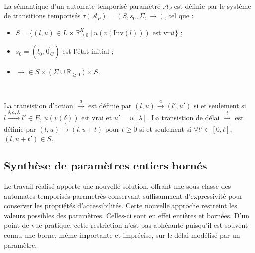 \documentclass{article}
\begin{document}
        ~

        La sémantique d'un automate temporisé paramètré $\mathcal{A}_P$ est
        définie par le système de transitions temporisés $\tau(\mathcal{A}_P) =
        (S,s_0,\Sigma,\rightarrow)$, tel que :
        
        \begin{itemize}
          \item $S = \{(l,u) \in L \times \mathbb{R}_{\geq 0}^X ~|~
            u(v(\mathrm{Inv}(l)))$ est vrai$\}$ ;
          \item $s_0 = (l_0, \vec{0}_C)$ est l'état initial ;
          \item $\rightarrow \in S \times (\Sigma \cup \mathbb{R}_{\geq 0})
            \times S$.
        \end{itemize}
        
        ~
        
        La transistion d'action $\xrightarrow{a}$ est définie par $(l,u)
        \xrightarrow{a} (l',u')$ si et seulement si $l \xrightarrow{\delta,a,
          \lambda} l' \in E$, $u(v(\delta))$ est vrai et $u' = u[\lambda]$. La
        transistion de délai $\xrightarrow{t}$ est définie par $(l,u)
        \xrightarrow{t} (l,u+t)$ pour $t \geq 0$ si et seulement si $\forall t'
        \in [0,t]$, $(l,u+t') \in S$.

    \subsection{Synthèse de paramètres entiers bornés}

      
      Le travail réalisé \cite{jovanovic14} apporte une nouvelle solution,
      offrant une sous classe des automates temporisés parametrés conservant
      suffisamment d'expressivité pour conserver les propriétés
      d'accessibilités. Cette nouvelle approche restreint les valeurs possibles
      des paramètres. Celles-ci sont en effet entières et bornées. D'un
      point de vue pratique, cette restriction n'est pas abhérante puisqu'il est
      souvent connu une borne, même importante et imprécise, sur le délai
      modélisé par un paramètre.
      
\end{document}
